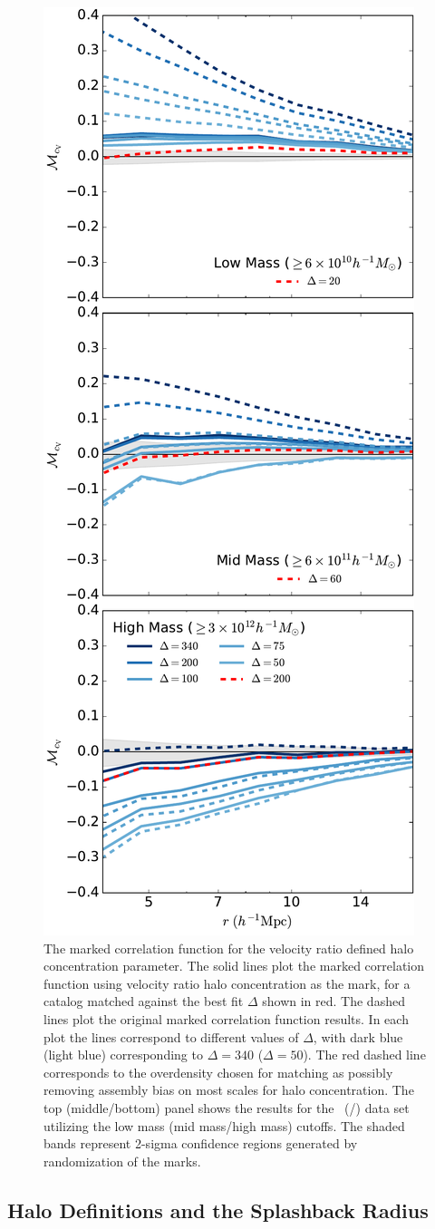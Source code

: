 \documentclass[usenatbib,fleqn]{mnras}
\begin{document}
\begin{figure}
	\centering
	\includegraphics[width=.4\textwidth]{match_mcf_cV.pdf}
	\caption{The marked correlation function for the velocity ratio defined halo concentration parameter. The solid lines plot the marked correlation function using velocity ratio halo concentration as the mark, for a catalog matched against the best fit $\Delta$ shown in red. The dashed lines plot the original marked correlation function results. In each plot the lines correspond to different values of $\Delta$, with dark blue (light blue) corresponding to $\Delta = 340$ ($\Delta = 50$). The red dashed line corresponds to the overdensity chosen for matching as possibly removing assembly bias on most scales for halo concentration. The top (middle/bottom) panel shows the results for the
\simA \ (\simB /\simC) data set utilizing the low mass (mid mass/high mass) cutoffs. The shaded bands represent 2-sigma confidence regions generated by randomization of the marks. }
	\label{fig:hvm_mcf_cV}
\end{figure}

\subsection{Halo Definitions and the Splashback Radius}
\end{document}

